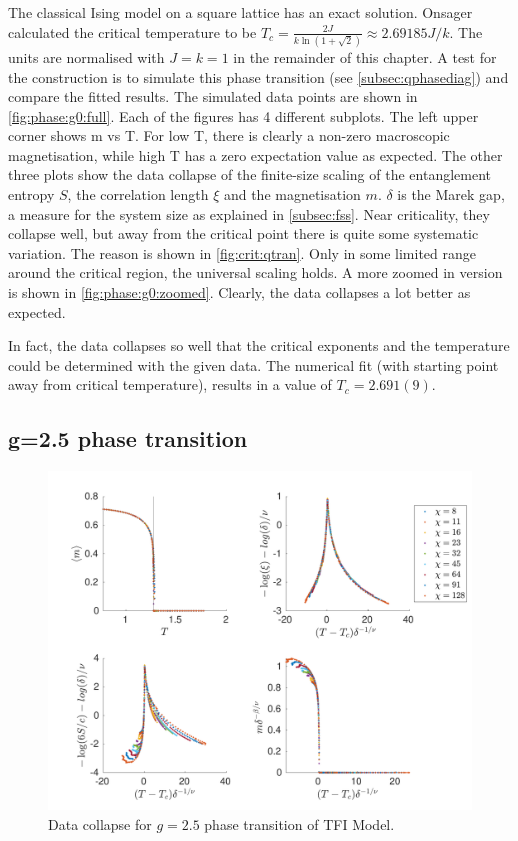 The classical Ising model on a square lattice has an exact solution. Onsager calculated the critical temperature to be $T_c = \frac{2 J}{k \ln(1+\sqrt{2}) } \approx 2.69185 J/k$.  The units are normalised with $J=k=1$ in the remainder of this chapter. A test for the construction is to simulate this phase transition (see \cref{subsec:qphasediag}) and compare the fitted  results. The simulated data points are shown in \cref{fig:phase:g0:full}. Each of the figures has 4 different subplots. The left upper corner shows m vs T. For low T, there is clearly a non-zero macroscopic magnetisation, while high T has a zero expectation value as expected. The other three plots show the data collapse of the finite-size scaling of the entanglement entropy $S$, the correlation length $\xi$ and the magnetisation $m$. $\delta$ is the Marek gap, a measure for the system size as explained in \cref{subsec:fss}. Near criticality, they collapse well, but away from the critical point there is quite some systematic variation. The reason is shown in \cref{fig:crit:qtran}. Only in some limited range around the critical region, the universal scaling holds. A more zoomed in version is shown in \cref{fig:phase:g0:zoomed}. Clearly, the data collapses a lot better as expected.

In fact, the data collapses so well that the critical exponents and the temperature could be determined with the given data. The numerical fit (with starting point away from  critical temperature), results in a value of $T_c = 2.691(9) $.

\subsection{g=2.5 phase transition}

\begin{figure}[!htbp]
  \center
  \includegraphics[width=\textwidth]{Figuren/phasediag/g25/Full.pdf}
  \caption{ Data collapse for $g=2.5$ phase transition of \Gls{TFI} Model. }
  \label{fig:phase:g25:full}
\end{figure}


